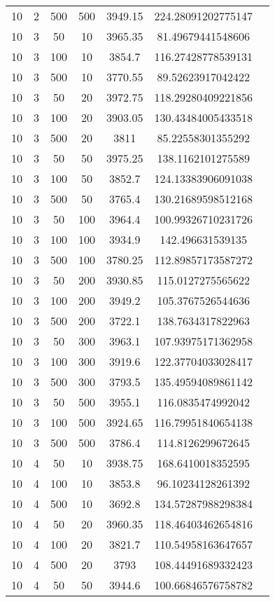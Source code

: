 {\begin{longtabu}{S
S
S
S
S
S[round-mode=places, round-precision=0]
S[round-mode=places, round-precision=0]}
10 & 2 & 500 & 500 & 3949.15 & 224.28091202775147 \\
10 & 3 & 50 & 10 & 3965.35 & 81.49679441548606 \\
10 & 3 & 100 & 10 & 3854.7 & 116.27428778539131 \\
10 & 3 & 500 & 10 & 3770.55 & 89.52623917042422 \\
10 & 3 & 50 & 20 & 3972.75 & 118.29280409221856 \\
10 & 3 & 100 & 20 & 3903.05 & 130.43484005433518 \\
10 & 3 & 500 & 20 & 3811 & 85.22558301355292 \\
10 & 3 & 50 & 50 & 3975.25 & 138.1162101275589 \\
10 & 3 & 100 & 50 & 3852.7 & 124.13383906091038 \\
10 & 3 & 500 & 50 & 3765.4 & 130.21689598512168 \\
10 & 3 & 50 & 100 & 3964.4 & 100.99326710231726 \\
10 & 3 & 100 & 100 & 3934.9 & 142.496631539135 \\
10 & 3 & 500 & 100 & 3780.25 & 112.89857173587272 \\
10 & 3 & 50 & 200 & 3930.85 & 115.0127275565622 \\
10 & 3 & 100 & 200 & 3949.2 & 105.3767526544636 \\
10 & 3 & 500 & 200 & 3722.1 & 138.7634317822963 \\
10 & 3 & 50 & 300 & 3963.1 & 107.93975171362958 \\
10 & 3 & 100 & 300 & 3919.6 & 122.37704033028417 \\
10 & 3 & 500 & 300 & 3793.5 & 135.49594089861142 \\
10 & 3 & 50 & 500 & 3955.1 & 116.0835474992042 \\
10 & 3 & 100 & 500 & 3924.65 & 116.79951840654138 \\
10 & 3 & 500 & 500 & 3786.4 & 114.8126299672645 \\
10 & 4 & 50 & 10 & 3938.75 & 168.6410018352595 \\
10 & 4 & 100 & 10 & 3853.8 & 96.10234128261392 \\
10 & 4 & 500 & 10 & 3692.8 & 134.57287988298384 \\
10 & 4 & 50 & 20 & 3960.35 & 118.46403462654816 \\
10 & 4 & 100 & 20 & 3821.7 & 110.54958163647657 \\
10 & 4 & 500 & 20 & 3793 & 108.44491689332423 \\
10 & 4 & 50 & 50 & 3944.6 & 100.66846576758782 \\

\end{longtabu}}
